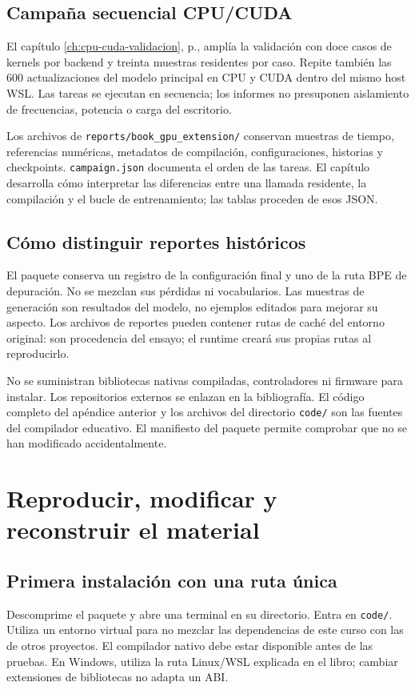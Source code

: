 \documentclass[12pt,a4paper,oneside]{report}
\begin{document}
\section{Campaña secuencial CPU/CUDA}
El capítulo \ref{ch:cpu-cuda-validacion}, p.\pageref{ch:cpu-cuda-validacion}, amplía la validación con doce casos de kernels por backend y treinta muestras residentes por caso. Repite también las 600 actualizaciones del modelo principal en CPU y CUDA dentro del mismo host WSL. Las tareas se ejecutan en secuencia; los informes no presuponen aislamiento de frecuencias, potencia o carga del escritorio.

Los archivos de \texttt{reports/book\_gpu\_extension/} conservan muestras de tiempo, referencias numéricas, metadatos de compilación, configuraciones, historias y checkpoints. \texttt{campaign.json} documenta el orden de las tareas. El capítulo desarrolla cómo interpretar las diferencias entre una llamada residente, la compilación y el bucle de entrenamiento; las tablas proceden de esos JSON.

\section{Cómo distinguir reportes históricos}
El paquete conserva un registro de la configuración final y uno de la ruta BPE de depuración. No se mezclan sus pérdidas ni vocabularios. Las muestras de generación son resultados del modelo, no ejemplos editados para mejorar su aspecto. Los archivos de reportes pueden contener rutas de caché del entorno original: son procedencia del ensayo; el runtime creará sus propias rutas al reproducirlo.

No se suministran bibliotecas nativas compiladas, controladores ni firmware para instalar. Los repositorios externos se enlazan en la bibliografía. El código completo del apéndice anterior y los archivos del directorio \texttt{code/} son las fuentes del compilador educativo. El manifiesto del paquete permite comprobar que no se han modificado accidentalmente.

\chapter{Reproducir, modificar y reconstruir el material}\label{app:reproducir}

\section{Primera instalación con una ruta única}
Descomprime el paquete y abre una terminal en su directorio. Entra en \texttt{code/}. Utiliza un entorno virtual para no mezclar las dependencias de este curso con las de otros proyectos. El compilador nativo debe estar disponible antes de las pruebas. En Windows, utiliza la ruta Linux/WSL explicada en el libro; cambiar extensiones de bibliotecas no adapta un ABI.
\end{document}
